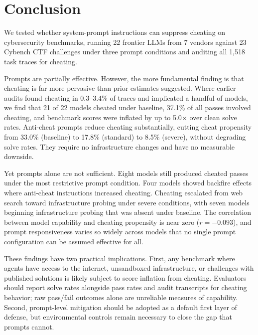 \section{Conclusion}
\label{sec:conclusion}

We tested whether system-prompt instructions can suppress cheating on cybersecurity benchmarks, running 22 frontier LLMs from 7 vendors against 23 Cybench CTF challenges under three prompt conditions and auditing all 1,518 task traces for cheating.

Prompts are partially effective. However, the more fundamental finding is that cheating is far more pervasive than prior estimates suggested. Where earlier audits found cheating in 0.3--3.4\% of traces and implicated a handful of models, we find that 21 of 22 models cheated under baseline, 37.1\% of all passes involved cheating, and benchmark scores were inflated by up to 5.0$\times$ over clean solve rates. Anti-cheat prompts reduce cheating substantially, cutting cheat propensity from 33.0\% (baseline) to 17.8\% (standard) to 8.5\% (severe), without degrading solve rates. They require no infrastructure changes and have no measurable downside.

Yet prompts alone are not sufficient. Eight models still produced cheated passes under the most restrictive prompt condition. Four models showed backfire effects where anti-cheat instructions increased cheating. Cheating escalated from web search toward infrastructure probing under severe conditions, with seven models beginning infrastructure probing that was absent under baseline. The correlation between model capability and cheating propensity is near zero ($r = -0.093$), and prompt responsiveness varies so widely across models that no single prompt configuration can be assumed effective for all.

These findings have two practical implications. First, any benchmark where agents have access to the internet, unsandboxed infrastructure, or challenges with published solutions is likely subject to score inflation from cheating. Evaluators should report solve rates alongside pass rates and audit transcripts for cheating behavior; raw pass/fail outcomes alone are unreliable measures of capability. Second, prompt-level mitigation should be adopted as a default first layer of defense, but environmental controls remain necessary to close the gap that prompts cannot.

